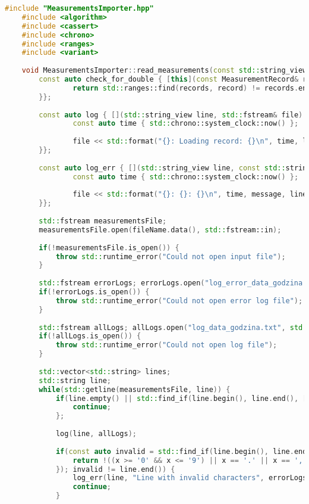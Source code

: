 \begin{lstlisting}[caption=Zawartość pliku \texttt{MeasurementsImporter.cpp}, label={lst:msimportercpp}, language=C++]
	#include "MeasurementsImporter.hpp"
	#include <algorithm>
	#include <cassert>
	#include <chrono>
	#include <ranges>
	#include <variant>
	
	void MeasurementsImporter::read_measurements(const std::string_view fileName) {
		const auto check_for_double { [this](const MeasurementRecord& record) -> bool {
				return std::ranges::find(records, record) != records.end();
		}};
		
		const auto log { [](std::string_view line, std::fstream& file) {
				const auto time { std::chrono::system_clock::now() };
				
				file << std::format("{}: Loading record: {}\n", time, line);
		}};
		
		const auto log_err { [](std::string_view line, const std::string_view message, std::fstream& file) {
				const auto time { std::chrono::system_clock::now() };
				
				file << std::format("{}: {}: {}\n", time, message, line);
		}};
		
		std::fstream measurementsFile;
		measurementsFile.open(fileName.data(), std::fstream::in);
		
		if(!measurementsFile.is_open()) {
			throw std::runtime_error("Could not open input file");
		}
		
		std::fstream errorLogs; errorLogs.open("log_error_data_godzina.txt", std::fstream::app);
		if(!errorLogs.is_open()) {
			throw std::runtime_error("Could not open error log file");
		}
		
		std::fstream allLogs; allLogs.open("log_data_godzina.txt", std::fstream::app);
		if(!allLogs.is_open()) {
			throw std::runtime_error("Could not open log file");
		}
		
		std::vector<std::string> lines;
		std::string line; 
		while(std::getline(measurementsFile, line)) {
			if(line.empty() || std::find_if(line.begin(), line.end(), [](const auto ch) { return !isspace(ch); }) == line.end()) {
				continue;
			};
			
			log(line, allLogs);
			
			if(const auto invalid = std::find_if(line.begin(), line.end(), [](const auto x) {
				return !((x >= '0' && x <= '9') || x == '.' || x == ',' || x == ':' || x == '\"' || isspace(x));
			}); invalid != line.end()) {
				log_err(line, "Line with invalid characters", errorLogs);
				continue;
			}
			

\end{lstlisting}
